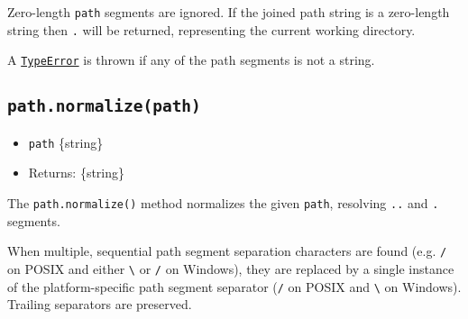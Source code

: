 Zero-length \texttt{path} segments are ignored. If the joined path
string is a zero-length string then
\texttt{\textquotesingle{}.\textquotesingle{}} will be returned,
representing the current working directory.

\begin{Shaded}
\begin{Highlighting}[]
\NormalTok{(}\OperatorTok{,} \OperatorTok{,} \OperatorTok{,} \OperatorTok{,} \NormalTok{)}\OperatorTok{;}

\NormalTok{(}\OperatorTok{,}\NormalTok{ \{\}}\OperatorTok{,} \NormalTok{)}\OperatorTok{;}
\end{Highlighting}
\end{Shaded}

A \href{errors.md\#class-typeerror}{\texttt{TypeError}} is thrown if any
of the path segments is not a string.

\subsection{\texorpdfstring{\texttt{path.normalize(path)}}{path.normalize(path)}}\label{path.normalizepath}

\begin{itemize}
\tightlist
\item
  \texttt{path} \{string\}
\item
  Returns: \{string\}
\end{itemize}

The \texttt{path.normalize()} method normalizes the given \texttt{path},
resolving \texttt{\textquotesingle{}..\textquotesingle{}} and
\texttt{\textquotesingle{}.\textquotesingle{}} segments.

When multiple, sequential path segment separation characters are found
(e.g. \texttt{/} on POSIX and either \texttt{\textbackslash{}} or
\texttt{/} on Windows), they are replaced by a single instance of the
platform-specific path segment separator (\texttt{/} on POSIX and
\texttt{\textbackslash{}} on Windows). Trailing separators are
preserved.

